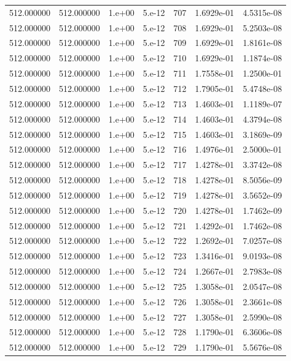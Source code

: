 \begin{table}[htbp]
\begin{tabular}{rrrrrrr}
512.000000 & 512.000000 & 1.e+00 & 5.e-12 & 707 & 1.6929e-01 & 4.5315e-08 \\
512.000000 & 512.000000 & 1.e+00 & 5.e-12 & 708 & 1.6929e-01 & 5.2503e-08 \\
512.000000 & 512.000000 & 1.e+00 & 5.e-12 & 709 & 1.6929e-01 & 1.8161e-08 \\
512.000000 & 512.000000 & 1.e+00 & 5.e-12 & 710 & 1.6929e-01 & 1.1874e-08 \\
512.000000 & 512.000000 & 1.e+00 & 5.e-12 & 711 & 1.7558e-01 & 1.2500e-01 \\
512.000000 & 512.000000 & 1.e+00 & 5.e-12 & 712 & 1.7905e-01 & 5.4748e-08 \\
512.000000 & 512.000000 & 1.e+00 & 5.e-12 & 713 & 1.4603e-01 & 1.1189e-07 \\
512.000000 & 512.000000 & 1.e+00 & 5.e-12 & 714 & 1.4603e-01 & 4.3794e-08 \\
512.000000 & 512.000000 & 1.e+00 & 5.e-12 & 715 & 1.4603e-01 & 3.1869e-09 \\
512.000000 & 512.000000 & 1.e+00 & 5.e-12 & 716 & 1.4976e-01 & 2.5000e-01 \\
512.000000 & 512.000000 & 1.e+00 & 5.e-12 & 717 & 1.4278e-01 & 3.3742e-08 \\
512.000000 & 512.000000 & 1.e+00 & 5.e-12 & 718 & 1.4278e-01 & 8.5056e-09 \\
512.000000 & 512.000000 & 1.e+00 & 5.e-12 & 719 & 1.4278e-01 & 3.5652e-09 \\
512.000000 & 512.000000 & 1.e+00 & 5.e-12 & 720 & 1.4278e-01 & 1.7462e-09 \\
512.000000 & 512.000000 & 1.e+00 & 5.e-12 & 721 & 1.4292e-01 & 1.7462e-08 \\
512.000000 & 512.000000 & 1.e+00 & 5.e-12 & 722 & 1.2692e-01 & 7.0257e-08 \\
512.000000 & 512.000000 & 1.e+00 & 5.e-12 & 723 & 1.3416e-01 & 9.0193e-08 \\
512.000000 & 512.000000 & 1.e+00 & 5.e-12 & 724 & 1.2667e-01 & 2.7983e-08 \\
512.000000 & 512.000000 & 1.e+00 & 5.e-12 & 725 & 1.3058e-01 & 2.0547e-08 \\
512.000000 & 512.000000 & 1.e+00 & 5.e-12 & 726 & 1.3058e-01 & 2.3661e-08 \\
512.000000 & 512.000000 & 1.e+00 & 5.e-12 & 727 & 1.3058e-01 & 2.5990e-08 \\
512.000000 & 512.000000 & 1.e+00 & 5.e-12 & 728 & 1.1790e-01 & 6.3606e-08 \\
512.000000 & 512.000000 & 1.e+00 & 5.e-12 & 729 & 1.1790e-01 & 5.5676e-08 \\

\end{tabular}
\end{table}
